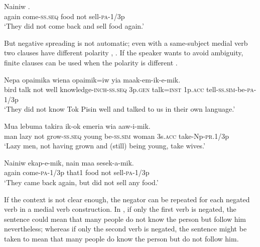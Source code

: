 \ea%
\label{ex:6:x1140}
\gll Nainiw        . \\
again  come-\textsc{ss}.\textsc{seq}  food  not  sell-\textsc{pa}-1/3p\\
\glt `They did not come back and sell food again.'
\z

But negative spreading is not automatic; even with a same-subject medial verb two clauses  have different polarity , . If the speaker wants to avoid ambiguity, finite clauses can be used when the polarity is different .

\ea%
\label{ex:6:x1156}
\gll Nepa  opaimika        wiena opaimik=iw  yia  maak-em-ik-e-mik.\\
bird  talk  not  well  knowledge-\textsc{inch}-\textsc{ss}.\textsc{seq}  3p.\textsc{gen} talk=\textsc{inst}  1p.\textsc{acc}  tell-\textsc{ss}.\textsc{sim}-be-\textsc{pa}-1/3p\\
\glt `They did not know Tok Pisin well and talked to us in their own language.'
\z

\ea%
\label{ex:6:x1763}
\gll Mua  lebuma      takira  ik-ok  emeria wia  aaw-i-mik.\\
man  lazy  not  grow-\textsc{ss}.\textsc{seq}  young  be-\textsc{ss}.\textsc{sim}  woman 3s.\textsc{acc}  take-Np-\textsc{pr}.1/3p\\
\glt `Lazy men, not having grown and (still) being young, take wives.'
\z

\ea%
\label{ex:6:x1153}
\gll Nainiw  ekap-e-mik,  nain  maa    sesek-a-mik. \\
again  come-\textsc{pa}-1/3p  that1  food  not  sell-\textsc{pa}-1/3p\\
\glt `They came back again, but did not sell any food.'
\z

If the context is not clear enough, the negator can be repeated for each negated verb in a medial verb construction. In , if only the first verb is negated, the sentence could mean that many people do not know the person but follow him nevertheless; whereas if only the second verb is negated, the sentence might be taken to mean that many people do know the person but do not follow him. 

